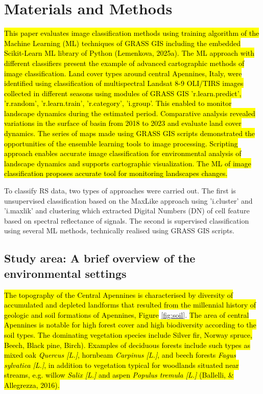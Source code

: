 \documentclass[eprint,
approc,		%
]{actapoly}
\begin{document}
\section{Materials and Methods}

\hl{This paper evaluates image classification methods using training algorithm of the Machine Learning (ML) techniques of GRASS GIS including the embedded Scikit-Learn ML library of Python (Lemenkova, 2025a). The ML approach with different classifiers present the example of advanced cartographic methods of image classification. Land cover types around central Apennines, Italy, were identified using classification of multispectral Landsat 8-9 OLI/TIRS images collected in different seasons using modules of GRASS GIS 'r.learn.predict', 'r.random', 'r.learn.train', 'r.category', 'i.group'. This enabled to monitor landscape dynamics during the estimated period. Comparative analysis revealed variations in the surface of basin from 2018 to 2023 and evaluate land cover dynamics. The series of maps made using GRASS GIS scripts demonstrated the opportunities of the ensemble learning tools to image processing. Scripting approach enables accurate image classification for environmental analysis of landscape dynamics and supports cartographic visualization. The ML of image classification proposes accurate tool for monitoring landscapes changes.}

To classify RS data, two types of approaches were carried out. The first is unsupervised classification based on the MaxLike approach using 'i.cluster' and 'i.maxlik' and clustering which extracted Digital Numbers (DN) of cell feature based on spectral reflectance of signals. The second is supervised classification using several ML methods, technically realised using GRASS GIS scripts.

\subsection{Study area: A brief overview of the environmental settings}

\hl{The topography of the Central Apennines is characterised by diversity of accumulated and depleted landforms that resulted from the millennial history of geologic and soil formations of Apennines, Figure} \ref{fig:soil}. \hl{The area of central Apennines is notable for high forest cover and high biodiversity according to the soil types. The dominating vegetation species include Silver fir, Norway spruce, Beech, Black pine, Birch). Examples of deciduous forests include such types as mixed oak \emph{Quercus [L.]}, hornbeam \emph{Carpinus [L.]}, and beech forests \emph{Fagus sylvatica [L.]}, in addition to vegetation typical for woodlands situated near streams, e.g. willow \emph{Salix [L.]} and aspen \emph{Populus tremula [L.]} (Ballelli, \& Allegrezza, 2016). }
\end{document}

